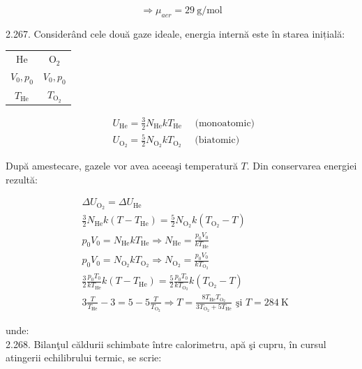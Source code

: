 \documentclass[10pt]{article}
\begin{document}
$$
\Rightarrow \mu_{a e r}=29 \mathrm{~g} / \mathrm{mol}
$$

2.267. Considerând cele două gaze ideale, energia internă este în starea inițială:

\begin{center}
\begin{tabular}{|c|c|}
\hline
He & $\mathrm{O}_{2}$ \\
$V_{0}, p_{0}$ & $V_{0}, p_{0}$ \\
$T_{\mathrm{He}}$ & $T_{\mathrm{O}_{2}}$ \\
\hline
\end{tabular}
\end{center}

$$
\begin{aligned}
& U_{\mathrm{He}}=\frac{3}{2} N_{\mathrm{He}} k T_{\mathrm{He}} \quad \text { (monoatomic) } \\
& U_{\mathrm{O}_{2}}=\frac{5}{2} N_{\mathrm{O}_{2}} k T_{\mathrm{O}_{2}} \quad \text { (biatomic) }
\end{aligned}
$$

După amestecare, gazele vor avea aceeaşi temperatură $T$. Din conservarea energiei rezultă:

$$
\begin{aligned}
& \Delta U_{\mathrm{O}_{2}}=\Delta U_{\mathrm{He}} \\
& \frac{3}{2} N_{\mathrm{He}} k\left(T-T_{\mathrm{He}}\right)=\frac{5}{2} N_{\mathrm{O}_{2}} k\left(T_{\mathrm{O}_{2}}-T\right) \\
& p_{0} V_{0}=N_{\mathrm{He}} k T_{\mathrm{He}} \Rightarrow N_{\mathrm{He}}=\frac{p_{0} V_{0}}{k T_{\mathrm{He}}} \\
& p_{0} V_{0}=N_{\mathrm{O}_{2}} k T_{\mathrm{O}_{2}} \Rightarrow N_{\mathrm{O}_{2}}=\frac{p_{0} V_{0}}{k T_{\mathrm{O}_{2}}} \\
& \frac{3}{2} \frac{p_{0} T_{0}}{k T_{\mathrm{He}}} k\left(T-T_{\mathrm{He}}\right)=\frac{5}{2} \frac{p_{0} T_{0}}{k T_{\mathrm{O}_{2}}} k\left(T_{\mathrm{O}_{2}}-T\right) \\
& 3 \frac{T}{T_{\mathrm{He}}}-3=5-5 \frac{T}{T_{\mathrm{O}_{2}}} \Rightarrow T=\frac{8 T_{\mathrm{He}} T_{\mathrm{O}_{2}}}{3 T_{\mathrm{O}_{2}}+5 T_{\mathrm{He}}} \text { şi } T=284 \mathrm{~K}
\end{aligned}
$$

unde:\\
2.268. Bilanţul căldurii schimbate între calorimetru, apă şi cupru, în cursul atingerii echilibrului termic, se scrie:
\end{document}
